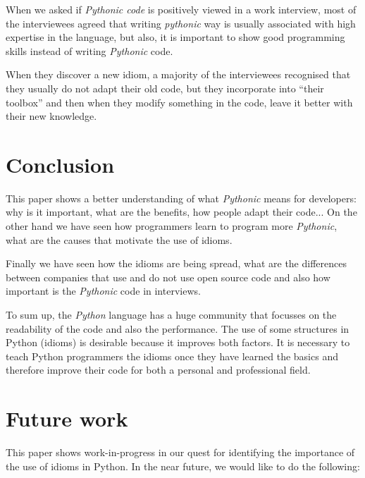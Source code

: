 \documentclass[a4paper]{article}
\begin{document}
When we asked if \textit{Pythonic code} is positively viewed in a work interview, most of the interviewees agreed that writing \textit{pythonic} way is usually associated with high expertise in the language, but also, it is important to show good programming skills instead of writing \textit{Pythonic} code.

When they discover a new idiom, a majority of the interviewees recognised that they usually do not adapt their old code, but they incorporate into  ``their toolbox'' and then when they modify something in the code, leave it better with their new knowledge.


\section{Conclusion}

This paper shows a better understanding of what \textit{Pythonic} means for developers: why is it important, what are the benefits, how people adapt their code... On the other hand we have seen how programmers learn to program more \textit{Pythonic}, what are the causes that motivate the use of idioms. 

Finally we have seen how the idioms are being spread, what are the differences between companies that use and do not use open source code and also how important is the \textit{Pythonic} code in interviews.

To sum up, the \textit{Python} language has a huge community that focusses on the readability of the code and also the performance. The use of some structures in Python (idioms) is desirable because it improves both factors. It is necessary to teach Python programmers the idioms once they have learned the basics and therefore improve their code for both a personal and professional field.

\section{Future work}

This paper shows work-in-progress in our quest for identifying the importance of the use of idioms in Python. In the near future, we would like to do the following:
\end{document}
